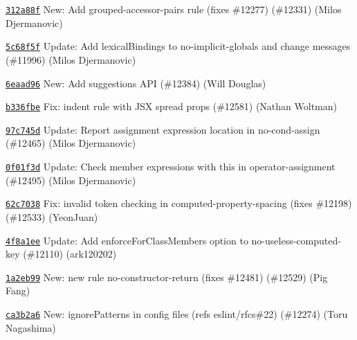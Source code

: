 \begin{DoxyItemize}
\item \href{https://github.com/eslint/eslint/commit/312a88f2230082d898b7d8d82f8af63cb352e55a}{\texttt{ {\ttfamily 312a88f}}} New\+: Add grouped-\/accessor-\/pairs rule (fixes \#12277) (\#12331) (Milos Djermanovic)
\item \href{https://github.com/eslint/eslint/commit/5c68f5feeb4a6c0cb53ff76b2fd255b5bfa69c93}{\texttt{ {\ttfamily 5c68f5f}}} Update\+: Add \textquotesingle{}lexical\+Bindings\textquotesingle{} to no-\/implicit-\/globals and change messages (\#11996) (Milos Djermanovic)
\item \href{https://github.com/eslint/eslint/commit/6eaad964ff159d0a38de96c1104782ffe6858c78}{\texttt{ {\ttfamily 6eaad96}}} New\+: Add suggestions A\+PI (\#12384) (Will Douglas)
\item \href{https://github.com/eslint/eslint/commit/b336fbedecd85731611fdc2dfd8edb635a8b1c39}{\texttt{ {\ttfamily b336fbe}}} Fix\+: indent rule with J\+SX spread props (\#12581) (Nathan Woltman)
\item \href{https://github.com/eslint/eslint/commit/97c745dc277febbea82552a4d9186e3df847f860}{\texttt{ {\ttfamily 97c745d}}} Update\+: Report assignment expression location in no-\/cond-\/assign (\#12465) (Milos Djermanovic)
\item \href{https://github.com/eslint/eslint/commit/0f01f3d0807c580631c2fdcff29192a64a870637}{\texttt{ {\ttfamily 0f01f3d}}} Update\+: Check member expressions with {\ttfamily this} in operator-\/assignment (\#12495) (Milos Djermanovic)
\item \href{https://github.com/eslint/eslint/commit/62c7038a493d89e4a7b14ac673a063d09d04057b}{\texttt{ {\ttfamily 62c7038}}} Fix\+: invalid token checking in computed-\/property-\/spacing (fixes \#12198) (\#12533) (Yeon\+Juan)
\item \href{https://github.com/eslint/eslint/commit/4f8a1ee1c26ccb5882e5e83ea7eab2f406c7476b}{\texttt{ {\ttfamily 4f8a1ee}}} Update\+: Add enforce\+For\+Class\+Members option to no-\/useless-\/computed-\/key (\#12110) (ark120202)
\item \href{https://github.com/eslint/eslint/commit/1a2eb99f11c65813bba11d6576a06cff2b823cc9}{\texttt{ {\ttfamily 1a2eb99}}} New\+: new rule no-\/constructor-\/return (fixes \#12481) (\#12529) (Pig Fang)
\item \href{https://github.com/eslint/eslint/commit/ca3b2a62c9e829dc4534bca3643d6bc729b46df0}{\texttt{ {\ttfamily ca3b2a6}}} New\+: ignore\+Patterns in config files (refs eslint/rfcs\#22) (\#12274) (Toru Nagashima)

\end{DoxyItemize}

